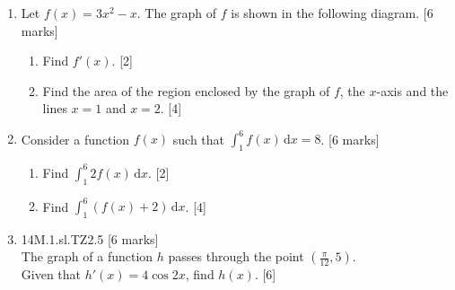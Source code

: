 \documentclass[12pt, twoside]{article}
\begin{document}
\begin{enumerate}
  \item Let $f(x)=3x^2-x$. The graph of $f$ is shown in the following diagram. \hfill [6 marks]
    \begin{center}
    \end{center}
    \begin{enumerate}
      \item Find $f'(x)$. \hfill [2]  \vspace{1.5cm}
      \item Find the area of the region enclosed by the graph of $f$, the $x$-axis and the lines $x = 1$ and $x = 2$. \hfill [4]
    \end{enumerate} \vspace{1.5cm}

    \item Consider a function $f(x)$ such that $\int_1^6 f(x) \,\mathrm{d}x
=8$. \hfill [6 marks]
    \begin{enumerate}
      \item Find $\int_1^6 2f(x) \,\mathrm{d}x$. \hfill [2] \vspace{1.5cm}
      \item Find $\int_1^6 (f(x)+2) \,\mathrm{d}x$. \hfill [4]
    \end{enumerate} \vspace{1.5cm}

    \item 14M.1.sl.TZ2.5 \hfill [6 marks]\\
    The graph of a function $h$ passes through the point $(\frac{\pi}{12},5)$.\\
    Given that $h'(x)=4 \cos 2x$, find $h(x)$. \hfill [6]



\newpage


\end{enumerate}
\end{document}
